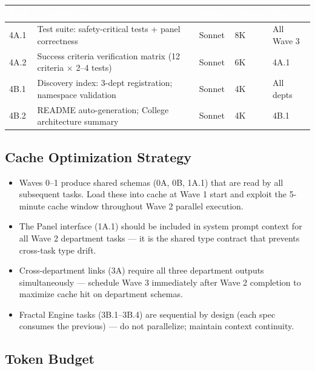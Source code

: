 \documentclass[11pt,letterpaper]{article}
\newcommand{\tableheader}[1]{\textbf{\sffamily\textcolor{white}{#1}}}
\begin{document}
\begin{center}
\begin{tabularx}{\textwidth}{C{1.2cm}L{5cm}C{2cm}C{2cm}C{2cm}}
\toprule
{}
\tableheader{Task} & \tableheader{Description} & \tableheader{Model} & \tableheader{Tokens} & \tableheader{Deps} \\
\midrule
4A.1 & Test suite: safety-critical tests + panel correctness & Sonnet & 8K & All Wave 3 \\
4A.2 & Success criteria verification matrix (12 criteria $\times$ 2--4 tests) & Sonnet & 6K & 4A.1 \\
4B.1 & Discovery index: 3-dept registration; namespace validation & Sonnet & 4K & All depts \\
4B.2 & README auto-generation; College architecture summary & Sonnet & 4K & 4B.1 \\
\bottomrule
\end{tabularx}
\end{center}

\subsection{Cache Optimization Strategy}

\begin{itemize}[leftmargin=1.5em]
  \item Waves 0--1 produce shared schemas (0A, 0B, 1A.1) that are read by all subsequent tasks. Load these into cache at Wave 1 start and exploit the 5-minute cache window throughout Wave 2 parallel execution.
  \item The Panel interface (1A.1) should be included in system prompt context for all Wave 2 department tasks --- it is the shared type contract that prevents cross-task type drift.
  \item Cross-department links (3A) require all three department outputs simultaneously --- schedule Wave 3 immediately after Wave 2 completion to maximize cache hit on department schemas.
  \item Fractal Engine tasks (3B.1--3B.4) are sequential by design (each spec consumes the previous) --- do not parallelize; maintain context continuity.
\end{itemize}

\subsection{Token Budget}
\end{document}
